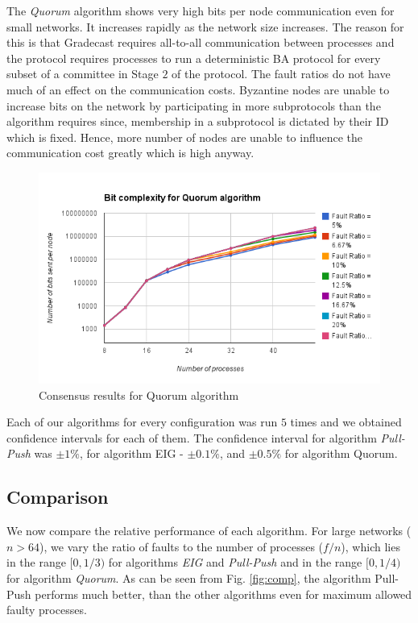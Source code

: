 The \textit{Quorum} algorithm shows very high bits per node communication even for small networks. It increases rapidly as the network size increases. The reason for this is that Gradecast requires all-to-all communication between processes and the protocol requires processes to run a deterministic BA protocol for every subset of a committee in Stage $2$ of the protocol. The fault ratios do not have much of an effect on the communication costs. Byzantine nodes are unable to increase bits on the network by participating in more subprotocols than the algorithm requires since, membership in a subprotocol is dictated by their ID which is fixed. Hence, more number of nodes are unable to influence the communication cost greatly which is high anyway.  
\begin{figure}[h]
 \centering
\includegraphics[scale=0.4]{quorum}
\caption{Consensus results for Quorum algorithm}
 \label{fig:quorum}
\end{figure}

Each of our algorithms for every configuration was run $5$ times and we obtained confidence intervals for each of them. The confidence interval for algorithm \textit{Pull-Push} was $\pm 1\%$, for algorithm EIG - $\pm 0.1\%$, and $\pm 0.5\%$ for algorithm Quorum.

\subsection{Comparison}
We now compare the relative performance of each algorithm. For large networks ($n > 64$), we vary the ratio of faults to the number of processes ($f/n$), which lies in the range $[0, 1/3)$ for algorithms \textit{EIG} and \textit{Pull-Push} and in the range $[0, 1/4)$ for algorithm \textit{Quorum}.
As can be seen from Fig. \ref{fig:comp}, the algorithm Pull-Push performs much better, than the other algorithms even for maximum allowed faulty processes.

